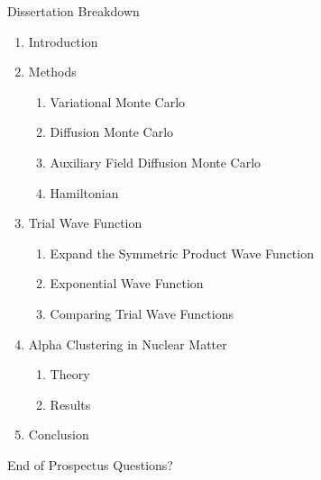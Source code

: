 \documentclass{beamer}
\begin{document}
\begin{frame}{Dissertation Breakdown}
\begin{enumerate}
   \item Introduction
   \item Methods
   \begin{enumerate}
      \item Variational Monte Carlo
      \item Diffusion Monte Carlo
      \item Auxiliary Field Diffusion Monte Carlo
      \item Hamiltonian
   \end{enumerate}
   \item Trial Wave Function
   \begin{enumerate}
      \item Expand the Symmetric Product Wave Function
      \item Exponential Wave Function
      \item Comparing Trial Wave Functions
   \end{enumerate}
   \item Alpha Clustering in Nuclear Matter
   \begin{enumerate}
      \item Theory
      \item Results
   \end{enumerate}
   \item Conclusion
\end{enumerate}
\end{frame}

\begin{frame}{End of Prospectus}
Questions?
\end{frame}
\end{document}
